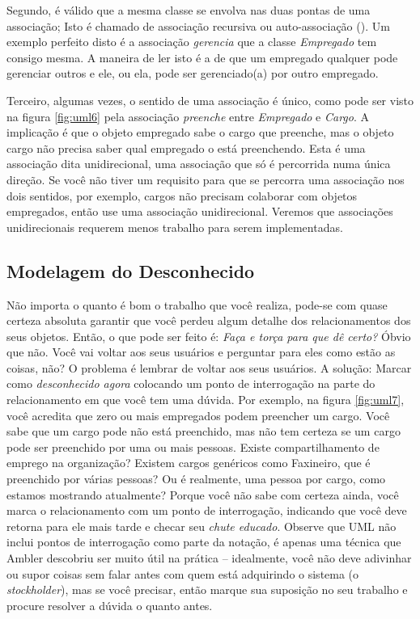 Segundo, é válido que a mesma classe se envolva nas duas pontas de uma associação; Isto é chamado de associação recursiva ou auto-associação (). Um exemplo perfeito disto é a associação \emph{gerencia} que a classe \emph{Empregado} tem consigo mesma. A maneira de ler isto é a de que um empregado qualquer pode gerenciar outros e ele, ou ela, pode ser gerenciado(a) por outro empregado.

Terceiro, algumas vezes, o sentido de uma associação é único, como pode ser visto na figura \ref{fig:uml6} pela associação \emph{preenche} entre \emph{Empregado} e \emph{Cargo}. A implicação é que o objeto empregado sabe o cargo que preenche, mas o objeto cargo não precisa saber qual empregado o está preenchendo. Esta é uma associação dita unidirecional, uma associação que só é percorrida numa única direção. Se você não tiver um requisito para que se percorra uma associação nos dois sentidos, por exemplo, cargos não precisam colaborar com objetos empregados, então use uma associação unidirecional. Veremos que associações unidirecionais requerem menos trabalho para serem implementadas.

\subsection{Modelagem do Desconhecido}

Não importa o quanto é bom o trabalho que você realiza, pode-se com quase certeza absoluta garantir que você perdeu algum detalhe dos relacionamentos dos seus objetos. Então, o que pode ser feito é: \textit{Faça e torça para que dê certo?} Óbvio que não. Você vai voltar aos seus usuários e perguntar para eles como estão as coisas, não? O problema é lembrar de voltar aos seus usuários. A solução: Marcar como \emph{desconhecido agora} colocando um ponto de interrogação na parte do relacionamento em que você tem uma dúvida. Por exemplo, na figura \ref{fig:uml7}, você acredita que zero ou mais empregados podem preencher um cargo. Você sabe que um cargo pode não está preenchido, mas não tem certeza se um cargo pode ser preenchido por uma ou mais pessoas. Existe compartilhamento de emprego na organização? Existem cargos genéricos como Faxineiro, que é preenchido por várias pessoas? Ou é realmente, uma pessoa por cargo, como estamos mostrando atualmente? Porque você não sabe com certeza ainda, você marca o relacionamento com um ponto de interrogação, indicando que você deve retorna para ele mais tarde e checar seu \emph{chute educado}. Observe que UML não inclui pontos de interrogação como parte da notação, é apenas uma técnica que Ambler descobriu ser muito útil na prática -- idealmente, você não deve adivinhar ou supor coisas sem falar antes com quem está adquirindo o sistema (o \textit{stockholder}), mas se você precisar, então marque sua suposição no seu trabalho e procure resolver a dúvida o quanto antes.

